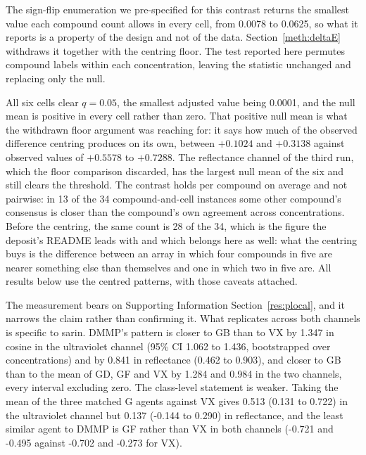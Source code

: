 \documentclass[11pt,a4paper]{article}
\begin{document}
The sign-flip enumeration we pre-specified for this contrast returns the
smallest value each compound count allows in every cell, from 0.0078 to 0.0625,
so what it reports is a property of the design and not of the data.
Section~\ref{meth:deltaE} withdraws it together with the centring floor. The
test reported here permutes compound labels within each concentration, leaving
the statistic unchanged and replacing only the null.

\begin{table}[!htb]
\centering
\caption{Premise test under the label-permutation null. The statistic is the
mean over compounds of (agreement with itself across concentrations) minus
(agreement with the other compounds' consensus patterns). Fixing the first
concentration's labels leaves $(n!)^{C-1}$ distinct relabellings, which is
enumerable for the four-compound set and sampled for the others.}
\label{tab:premisenull}

\end{table}

All six cells clear $q = 0.05$, the smallest adjusted value being 0.0001, and
the null mean is positive in every cell rather than zero. That positive null
mean is what the withdrawn floor argument was reaching for: it says how much of
the observed difference centring produces on its own, between $+0.1024$ and
$+0.3138$ against observed values of $+0.5578$ to $+0.7288$. The reflectance
channel of the third run, which the floor comparison discarded, has the largest
null mean of the six and still clears the threshold. The contrast holds per
compound on average and not pairwise: in 13 of the 34 compound-and-cell
instances some
other compound's consensus is closer than the compound's own agreement across
concentrations. Before the centring, the same count is 28 of the 34, which is
the figure the deposit's README leads with and which belongs here as well: what
the centring buys is the difference between an array in which four compounds in
five are nearer something else than themselves and one in which two in five
are. All results below use the centred patterns, with those caveats
attached.


The measurement bears on Supporting Information Section~\ref{res:plocal}, and it narrows the claim
rather than confirming it. What replicates across both channels is specific to
sarin. DMMP's pattern is closer to GB than to VX by 1.347 in cosine in the
ultraviolet channel (95\% CI 1.062 to 1.436, bootstrapped over concentrations)
and by 0.841 in reflectance (0.462 to 0.903), and closer to GB than to the mean
of GD, GF and VX by 1.284 and 0.984 in the two channels, every interval
excluding zero. The class-level statement is weaker. Taking the mean of the
three matched G agents against VX gives 0.513 (0.131 to 0.722) in the
ultraviolet channel but 0.137 (-0.144 to 0.290) in reflectance, and the least
similar agent to DMMP is GF rather than VX in both channels (-0.721 and -0.495
against -0.702 and -0.273 for VX).
\end{document}
